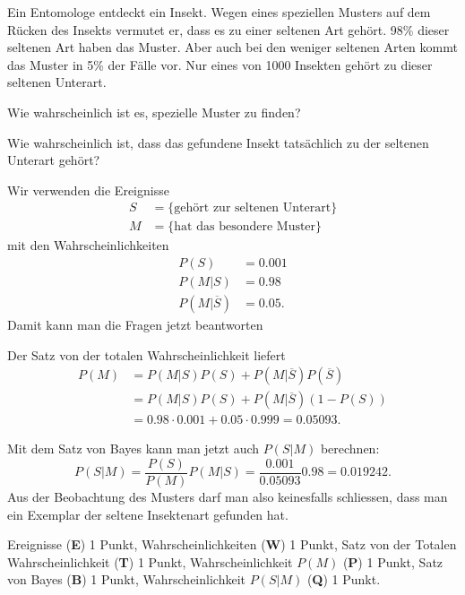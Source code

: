 Ein Entomologe entdeckt ein Insekt. Wegen eines speziellen Musters auf
dem Rücken des Insekts vermutet er, dass es zu einer seltenen Art
gehört.
98\% dieser seltenen Art haben das Muster.
Aber auch bei den weniger seltenen Arten kommt das Muster in 5\% der
Fälle vor.
Nur eines von 1000 Insekten gehört zu dieser seltenen Unterart.

\begin{teilaufgaben}
\item
Wie wahrscheinlich ist es, spezielle Muster zu finden?
\item
Wie wahrscheinlich ist, dass das gefundene Insekt tatsächlich zu der
seltenen Unterart gehört?
\end{teilaufgaben}

\begin{loesung}
Wir verwenden die Ereignisse
\begin{align*}
S&=\{\text{gehört zur seltenen Unterart}\}
\\
M&=\{\text{hat das besondere Muster}\}
\end{align*}
mit den Wahrscheinlichkeiten
\begin{align*}
P(S) &= 0.001
\\
P(M|S) &= 0.98
\\
P(M|\overline{S}) &= 0.05.
\end{align*}
Damit kann man die Fragen jetzt beantworten
\begin{teilaufgaben}
\item
Der Satz von der totalen Wahrscheinlichkeit liefert
\begin{align*}
P(M)
&=
P(M|S)P(S) + P(M|\overline{S})P(\overline{S})
\\
&=
P(M|S)P(S) + P(M|\overline{S})(1-P(S))
\\
&=
0.98\cdot 0.001 + 0.05\cdot 0.999
=
0.05093.
\end{align*}
\item
Mit dem Satz von Bayes kann man jetzt auch $P(S|M)$ berechnen:
\[
P(S|M)
=
\frac{P(S)}{P(M)}P(M|S)
=
\frac{0.001}{0.05093}0.98
=
0.019242.
\]
Aus der Beobachtung des Musters darf man also keinesfalls schliessen,
dass man ein Exemplar der seltene Insektenart gefunden hat.
\qedhere
\end{teilaufgaben}
\end{loesung}

\begin{bewertung}
Ereignisse ({\bf E}) 1 Punkt,
Wahrscheinlichkeiten ({\bf W}) 1 Punkt,
Satz von der Totalen Wahrscheinlichkeit ({\bf T}) 1 Punkt,
Wahrscheinlichkeit $P(M)$ ({\bf P}) 1 Punkt,
Satz von Bayes ({\bf B}) 1 Punkt,
Wahrscheinlichkeit $P(S|M)$ ({\bf Q}) 1 Punkt.
\end{bewertung}




